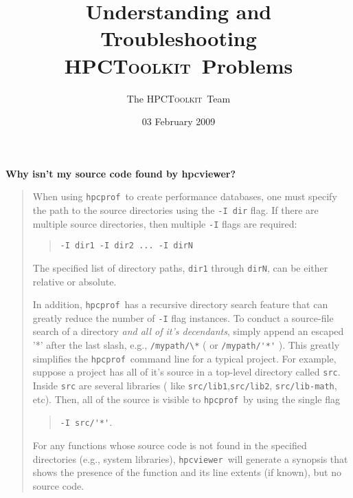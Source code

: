 \documentclass{article}
\newcommand{\HPCToolkit}{\textsc{HPCToolkit}}
\newcommand{\hpcprof}{\texttt{hpcprof}}
\newcommand{\hpcviewer}{\texttt{hpcviewer}}
\begin{document}
\title{Understanding and Troubleshooting \\
         \HPCToolkit\ Problems}
\author{The \HPCToolkit\ Team}
\date{03 February 2009}
\maketitle

\begin{comment}
no more hpcquick, bloop, csprof, etc

find out Nathan's default typeographic conventions  
\end{comment}

\textbf{Why isn't my source code found by hpcviewer?}
\begin{comment}
use -I ROOT_TO_SRC/'*'

'*' must appear at the end.

(circular links in recursive search may lead to  inf loop)
\end{comment}
\begin{quote}
When using \hpcprof\ to create performance databases, one must specify the path 
to the source directories using the \verb|-I dir| flag. If there are multiple
source directories, then multiple \verb|-I| flags are required:
\begin{quote}
 \verb|-I dir1 -I dir2 ... -I dirN|
\end{quote}
The specified list of directory paths, \verb|dir1| through \verb|dirN|, can be either
relative or absolute.

In addition, \hpcprof\ has a recursive directory search feature that can greatly reduce the
number of \verb|-I| flag instances. To conduct a source-file search of a directory 
\emph{and all of it's decendants}, simply append an escaped '*' after the last slash, e.g.,
\verb|/mypath/\*| ( or \verb|/mypath/'*'| ). This greatly simplifies the \hpcprof\ command line
for a typical project. For example, suppose a project has all of it's source in a top-level directory
called \verb|src|. Inside \verb|src| are several libraries ( like \verb|src/lib1|,\verb|src/lib2|,
\verb|src/lib-math|, etc). Then, all of the source is visible to \hpcprof\ by using the single flag
\begin{quote}
\verb|-I src/'*'|.
\end{quote}

For any functions whose source code is not found in the specified directories
(e.g., system libraries), \hpcviewer\ will generate a synopsis that shows
the presence of the function and its line extents (if known), but no
source code.

\end{quote}
\end{document}
